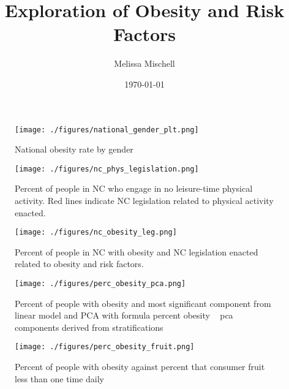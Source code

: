 \documentclass[11pt]{article}
\title{Exploration of Obesity and Risk Factors}
\author{Melissa Mischell}
\date{\today}
\begin{document}
\maketitle

\begin{figure}[h]
\texttt{[image: ./figures/national\_gender\_plt.png]}
\caption{National obesity rate by gender}
\label{fig:gender}
\end{figure}

\begin{figure}[h]
\texttt{[image: ./figures/nc\_phys\_legislation.png]}
\caption{
  Percent of people in NC who engage in no leisure-time physical activity. 
  Red lines indicate NC legislation related to physical activity enacted.
}
\label{fig:phys_act}
\end{figure}

\begin{figure}[h]
\texttt{[image: ./figures/nc\_obesity\_leg.png]}
\caption{
  Percent of people in NC with obesity and NC legislation enacted related to obesity and risk factors. 
}
\label{fig:nc_obesity}
\end{figure}

\begin{figure}[h]
\texttt{[image: ./figures/perc\_obesity\_pca.png]}
\caption{
  Percent of people with obesity and most significant component from linear model and PCA with formula percent obesity ~ pca components derived from stratifications   
}
\label{fig:nc_obesity}
\end{figure}

\begin{figure}[h]
\texttt{[image: ./figures/perc\_obesity\_fruit.png]}
\caption{
  Percent of people with obesity against percent that consumer fruit less than one time daily
}
\label{fig:obesity_fruit}
\end{figure}
\end{document}
